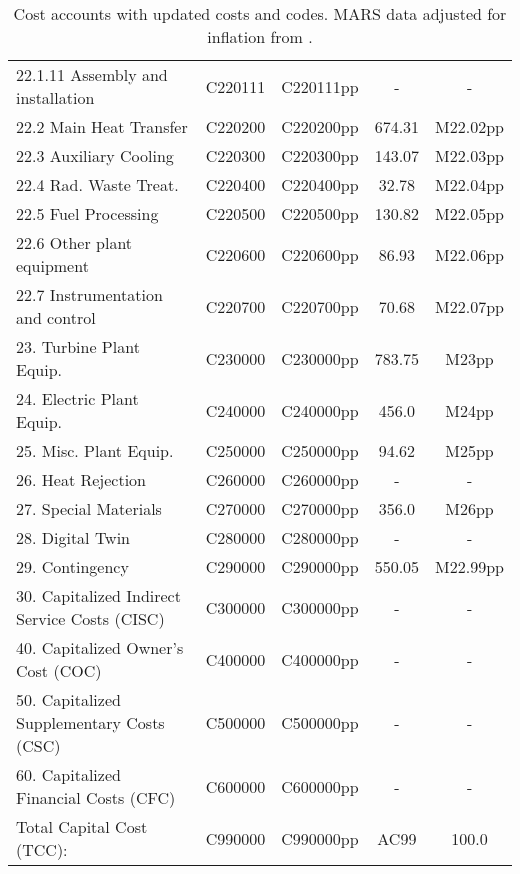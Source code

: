 \begin{table}[h!]
{\begin{tabular}{lcccc}
\hspace{15mm}22.1.11 Assembly and installation & C220111 & C220111pp & - & - \\
\hspace{10mm}22.2 Main Heat Transfer & C220200 & C220200pp & 674.31 & M22.02pp \\
\hspace{10mm}22.3 Auxiliary Cooling & C220300 & C220300pp & 143.07 & M22.03pp \\
\hspace{10mm}22.4 Rad. Waste Treat. & C220400 & C220400pp & 32.78 & M22.04pp \\
\hspace{10mm}22.5 Fuel Processing & C220500 & C220500pp & 130.82 & M22.05pp \\
\hspace{10mm}22.6 Other plant equipment & C220600 & C220600pp & 86.93 & M22.06pp \\
\hspace{10mm}22.7 Instrumentation and control & C220700 & C220700pp & 70.68 & M22.07pp \\
\hspace{5mm}23. Turbine Plant Equip. & C230000 & C230000pp & 783.75 & M23pp \\
\hspace{5mm}24. Electric Plant Equip. & C240000 & C240000pp & 456.0 & M24pp \\
\hspace{5mm}25. Misc. Plant Equip. & C250000 & C250000pp & 94.62 & M25pp \\
\hspace{5mm}26. Heat Rejection & C260000 & C260000pp & - & - \\
\hspace{5mm}27. Special Materials & C270000 & C270000pp & 356.0 & M26pp \\
\hspace{5mm}28. Digital Twin & C280000 & C280000pp & - & - \\
\hspace{5mm}29. Contingency & C290000 & C290000pp & 550.05 & M22.99pp \\
30. Capitalized Indirect Service Costs (CISC) & C300000 & C300000pp & - & - \\
40. Capitalized Owner’s Cost (COC) & C400000 & C400000pp & - & - \\
50. Capitalized Supplementary Costs (CSC) & C500000 & C500000pp & - & - \\
60. Capitalized Financial Costs (CFC) & C600000 & C600000pp & - & - \\
\hline
Total Capital Cost (TCC): & C990000 & C990000pp & AC99 & 100.0 \\
\hline
\end{tabular}
}
\caption{Cost accounts with updated costs and codes. MARS data adjusted for inflation from \cite{gordon1986mirror}.}
\label{tab:costsupdatedcodes}
\end{table}


